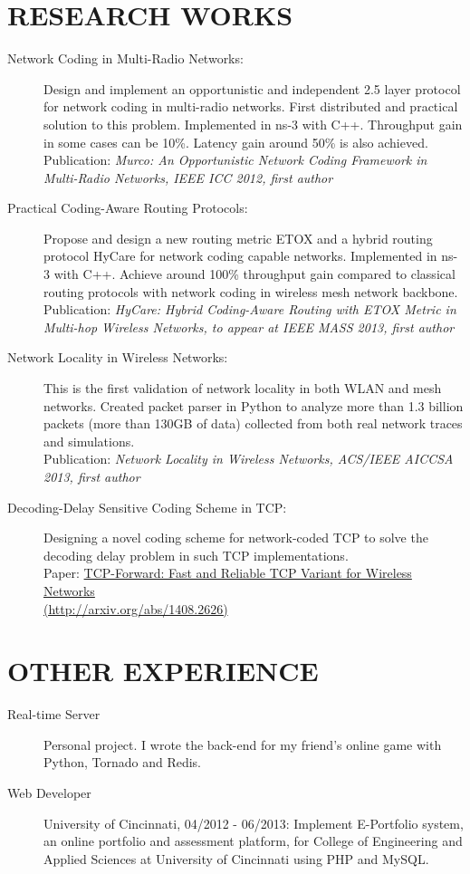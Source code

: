 \documentclass[line]{res}
\begin{document}
\begin{resume}
	\section{RESEARCH WORKS}
	\begin{description}
		\item[Network Coding in Multi-Radio Networks:]
			Design and implement an opportunistic and independent 2.5 layer protocol for network coding in multi-radio networks. First distributed and practical solution to this problem. Implemented in ns-3 with C++. Throughput gain in some cases can be 10\%. Latency gain around 50\% is also achieved. \\
			Publication: \emph{Murco: An Opportunistic Network Coding Framework in Multi-Radio Networks, IEEE ICC 2012, first author}
		\item[Practical Coding-Aware Routing Protocols:]
			Propose and design a new routing metric ETOX and a hybrid routing protocol HyCare for network coding capable networks. Implemented in ns-3 with C++. Achieve around 100\% throughput gain compared to classical routing protocols with network coding in wireless mesh network backbone.\\
			Publication: \emph{HyCare: Hybrid Coding-Aware Routing with ETOX Metric in Multi-hop Wireless Networks, to appear at IEEE MASS 2013, first author}
		\item[Network Locality in Wireless Networks:]
			This is the first validation of network locality in both WLAN and mesh networks. Created packet parser in Python to analyze more than 1.3 billion packets (more than 130GB of data) collected from both real network traces and simulations. \\
			Publication: \emph{Network Locality in Wireless Networks, ACS/IEEE AICCSA 2013, first author}
		\item [Decoding-Delay Sensitive Coding Scheme in TCP:]
			Designing a novel coding scheme for network-coded TCP to solve the decoding delay problem in such TCP implementations. \\
			Paper: \href{http://arxiv.org/abs/1408.2626}{TCP-Forward: Fast and Reliable TCP Variant for Wireless Networks \\ (http://arxiv.org/abs/1408.2626)}
	\end{description}
	
	\section{OTHER EXPERIENCE}
	\begin{description}
		\item[Real-time Server] Personal project. I wrote the back-end for my friend's online game with Python, Tornado and Redis.
		\item[Web Developer] University of Cincinnati, 04/2012 - 06/2013: Implement E-Portfolio system, an online portfolio and assessment platform, for College of Engineering and Applied Sciences at University of Cincinnati using PHP and MySQL. 
	\end{description}

\end{resume}
\end{document}
